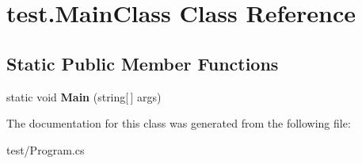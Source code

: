 \hypertarget{classtest_1_1MainClass}{}\section{test.\+Main\+Class Class Reference}
\label{classtest_1_1MainClass}
\subsection*{Static Public Member Functions}
\begin{DoxyCompactItemize}
\item 
\hypertarget{classtest_1_1MainClass_a4679ef28a1326b8af55f556b1b0e94a7}{}static void {\bfseries Main} (string\mbox{[}$\,$\mbox{]} args)\label{classtest_1_1MainClass_a4679ef28a1326b8af55f556b1b0e94a7}

\end{DoxyCompactItemize}


The documentation for this class was generated from the following file\+:\begin{DoxyCompactItemize}
\item 
test/Program.\+cs\end{DoxyCompactItemize}
